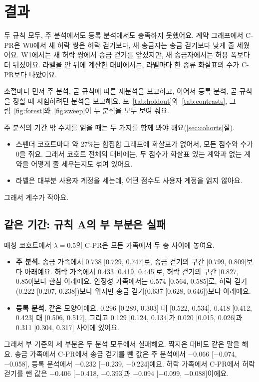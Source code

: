 \section{결과}
\label{sec:results}

\begin{yoji}
두 규칙 모두, 주 분석에서도 등록 분석에서도 충족하지 못했어요. 계약 그래프에서 C-PR은 W0에서 새 허락 쌍은 허락 걷기보다, 새 송금자는 송금 걷기보다 낮게 줄 세웠어요. W1에서는 새 허락 쌍에서 송금 걷기를 앞섰지만, 새 송금자에서는 허용 폭보다 더 뒤졌어요. 라벨을 안 뒤에 계산한 대비에서는, 라벨마다 한 종류 화살표의 수가 C-PR보다 나았어요.
\end{yoji}

소절마다 먼저 주 분석, 곧 규칙에 따른 재분석을 보고하고, 이어서 등록 분석, 곧 규칙을 정할 때 시험하려던 분석을 보고해요. 표~\ref{tab:holdout}와~\ref{tab:contrasts}, 그림~\ref{fig:forest}와~\ref{fig:sweep}이 두 분석을 모두 보여 줘요.

주 분석의 기간 밖 수치를 읽을 때는 두 가지를 함께 봐야 해요(\ref{sec:cohorts}절).
\begin{itemize}
\item 스펜더 코호트마다 약 27\%는 합집합 그래프에 화살표가 없어서, 모든 점수와 수가 0을 줘요. 그래서 코호트 전체의 대비에는, 두 점수가 화살표 있는 계약과 없는 계약을 어떻게 줄 세우는지도 섞여 있어요.
\item 라벨은 대부분 사용자 계정을 세는데, 어떤 점수도 사용자 계정을 읽지 않아요.
\end{itemize}
그래서 계수가 작아요.

\subsection{같은 기간: 규칙 A의 부 부분은 실패}
\label{sec:res-window}

매칭 코호트에서 $\lambda=0.5$의 C-PR은 모든 가족에서 두 층 사이에 놓여요.
\begin{itemize}
\item \textbf{주 분석.} 송금 가족에서 0.738 [0.729, 0.747]로, 송금 걷기의 구간 [0.799, 0.809]보다 아래예요. 허락 가족에서 0.433 [0.419, 0.445]로, 허락 걷기의 구간 [0.827, 0.850]보다 한참 아래예요. 안정성 가족에서는 0.574 [0.564, 0.585]로, 허락 걷기(0.222 [0.207, 0.238])보다 위지만 송금 걷기(0.637 [0.628, 0.646])보다 아래예요.
\item \textbf{등록 분석.} 같은 모양이에요. 0.296 [0.289, 0.303] 대 [0.522, 0.534], 0.418 [0.412, 0.423] 대 [0.506, 0.517], 그리고 0.129 [0.124, 0.134]가 0.020 [0.015, 0.026]과 0.311 [0.304, 0.317] 사이에 있어요.
\end{itemize}
그래서 부 기준의 세 부분은 두 분석 모두에서 실패해요. 짝지은 대비도 같은 말을 해요. 송금 가족에서 C-PR에서 송금 걷기를 뺀 값은 주 분석에서 −0.066 [−0.074, −0.058], 등록 분석에서 −0.232 [−0.239, −0.224]예요. 허락 가족에서 C-PR에서 허락 걷기를 뺀 값은 −0.406 [−0.418, −0.393]과 −0.094 [−0.099, −0.088]이에요.

